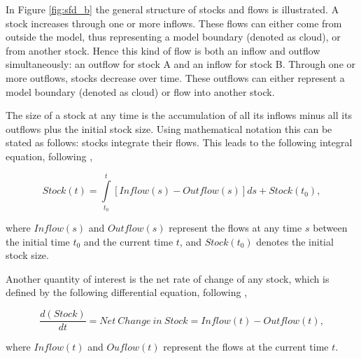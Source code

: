In Figure \ref{fig:sfd_b} the general structure of stocks and flows is illustrated. A stock increases through one or more inflows. These flows can either come from outside the model, thus representing a model boundary (denoted as cloud), or from another stock. Hence this kind of flow is both an inflow and outflow simultaneously: an outflow for stock A and an inflow for stock B. Through one or more outflows, stocks decrease over time. These outflows can either represent a model boundary (denoted as cloud) or flow into another stock.

The size of a stock at any time is the accumulation of all its inflows minus all its outflows plus the initial stock size. Using mathematical notation this can be stated as follows: stocks integrate their flows. This leads to the following integral equation, following \citet[p. 194]{Sterman2000},

\begin{equation}\label{eq:int}
		Stock(t) = \int\limits_{t_0}^t [Inflow(s) - Outflow(s)]ds + Stock(t_0),
\end{equation}

where $Inflow(s)$ and $Outflow(s)$ represent the flows at any time $s$ between the initial time $t_0$ and the current time $t$, and $Stock(t_0)$ denotes the initial stock size. 

Another quantity of interest is the net rate of change of any stock, which is defined by the following differential equation, following \citet[p. 194]{Sterman2000},

\begin{equation}\label{eq:dif}
		\frac{d(Stock)}{dt} = \mathit{Net~Change~in~Stock} = Inflow(t) - Outflow(t),
\end{equation}

where $Inflow(t)$ and $Ouflow(t)$ represent the flows at the current time $t$.


